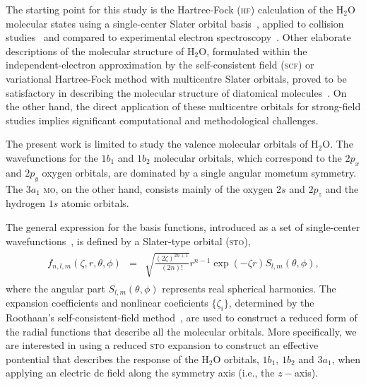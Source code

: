 The starting point for this study is the Hartree-Fock (\textsc{hf})
calculation of the H$_{2}$O molecular states using a single-center
Slater orbital
basis~\cite{Moccia_1964,Moccia_JCP_2164,Moccia_JCP_2176}, applied to
collision studies~\cite{Montanari_2013} and compared to experimental
electron spectroscopy~\cite{Hafied_2007}. Other elaborate descriptions
of the molecular structure of H$_{2}$O, formulated within the
independent-electron approximation by the self-consistent field
(\textsc{scf}) or variational Hartree-Fock method with multicentre
Slater orbitals, proved to be satisfactory in describing the molecular
structure of diatomical molecules~\cite{Pitzer_1968}. On the other
hand, the direct application of these multicentre orbitals for
strong-field studies implies significant computational and
methodological challenges.

The present work is limited to study the valence molecular orbitals of
H$_{2}$O. The wavefunctions for the $1b_{1}$ and $1b_{2}$ molecular
orbitals, which correspond to the $2p_{x}$ and $2p_{y}$ oxygen
orbitals, are dominated by a single angular mometum symmetry. The
$3a_{1}$ \textsc{mo}, on the other hand, consists mainly of the oxygen
$2s$ and $2p_{z}$ and the hydrogen $1s$ atomic orbitals.

The general expression for the basis functions, introduced as a set of
single-center
wavefunctions~\cite{Moccia_1964,Moccia_JCP_2164,Moccia_JCP_2176}, is
defined by a Slater-type orbital (\textsc{sto}),
%
\begin{eqnarray}
  \begin{split}
 f_{n, l, m}(\zeta,r,\theta,\phi) & = & \sqrt{\frac{(2\zeta)^{2n+1}}{(2n)!}}
 r^{n-1} \exp(-\zeta r) S_{l, m}(\theta,\phi),
 \end{split}
\label{eq:sto}
\end{eqnarray}
%
where the angular part $S_{l,m}(\theta,\phi)$ represents real
spherical harmonics. The expansion coefficients and nonlinear
coeficients $\{\zeta_{i}\}$, determined by the Roothaan's
self-consistent-field method~\cite{Moccia_1964,Roothaan_1951}, are
used to construct a reduced form of the radial functions that describe
all the molecular orbitals. More specifically, we are interested in
using a reduced \textsc{sto} expansion to construct an effective
pontential that describes the response of the H$_{2}$O orbitals,
$1b_{1}$, $1b_{2}$ and $3a_{1}$, when applying an electric dc field
along the symmetry axis (i.e., the $z-$axis).



